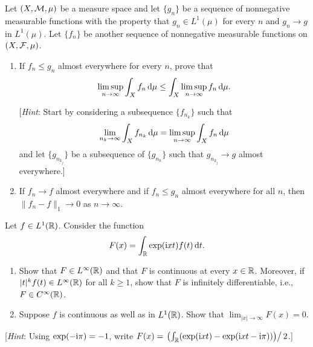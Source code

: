 \begin{problem}
  Let $(X,\mathcal{M},\mu)$ be a measure space and let $\{g_n\}$ be a sequence of
  nonnegative measurable functions with the property that $g_n\in L^1(\mu)$
  for every $n$ and $g_n\to g$ in $L^1(\mu)$. Let $\{f_n\}$ be another
  sequence of nonnegative measurable functions on $(X,\mathcal{F},\mu)$.
  \begin{enumerate}[label=(\roman*),noitemsep]
  \item If $f_n\leq g_n$ almost everywhere for every $n$, prove that
    \[
      \limsup_{n\to\infty}\int_X f_n\mathop{}\!\mathrm{d}\mu\leq\int_X\limsup_{n\to\infty}f_n\mathop{}\!\mathrm{d}\mu.
    \]

    [\emph{Hint}: Start by considering a subsequence $\{f_{n_k}\}$ such
    that
    \[
      \lim_{n_k\to\infty}\int_X
      f_{n_k}\mathop{}\!\mathrm{d}\mu=\limsup_{n\to\infty}\int_X f_n\mathop{}\!\mathrm{d}\mu
    \]
    and let $\{g_{n_{k_j}}\}$ be a subsequence of $\{g_{n_k}\}$ such
    that $g_{n_{k_j}}\to g$ almost everywhere.]
  \item If $f_n\to f$ almost everywhere and if $f_n\leq g_n$ almost
    everywhere for all $n$, then $\|f_n-f\|_1\to 0$ as $n\to\infty$.
  \end{enumerate}
\end{problem}
\begin{solution}
\end{solution}

\begin{problem}
  Let $f\in L^1(\mathbb{R})$. Consider the function
  \[
    F(x)=\int_{\mathbb{R}} \exp(\mathrm{i} xt) f(t)\mathop{}\!\mathrm{d} t.
  \]
  \begin{enumerate}[label=(\roman*),noitemsep]
  \item Show that $F\in L^\infty(\mathbb{R})$ and that $F$ is continuous at every
    $x\in\mathbb{R}$. Moreover, if $|t|^kf(t)\in L^\infty(\mathbb{R})$ for all $k\geq
    1$, show that $F$ is infinitely differentiable, i.e., $F\in
    C^\infty(\mathbb{R})$.
  \item Suppose $f$ is continuous as well as in $L^1(\mathbb{R})$. Show that
    $\lim_{|x|\to\infty} F(x)=0$.
  \end{enumerate}
  [\emph{Hint}: Using $\exp(-\mathrm{i}\pi)=-1$, write
  $F(x)=\left.\left(\int_{\mathbb{R}}(\exp(\mathrm{i} xt)-\exp(\mathrm{i} xt-\mathrm{i}\pi))\right)\right/2$.]
\end{problem}
\begin{solution}
\end{solution}

